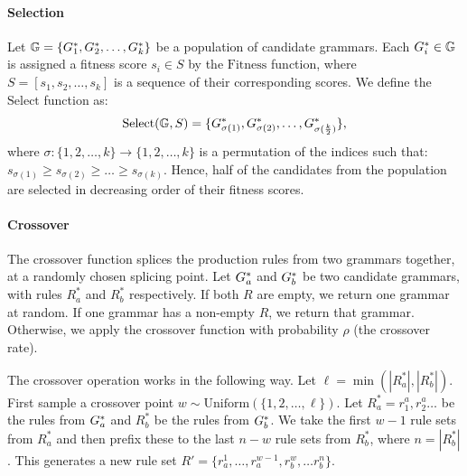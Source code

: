 \paragraph{Selection}
 Let $\mathbb{G} = \{G^*_1, G^*_2, \ldots, G^*_k\}$ be a population of candidate grammars.
% 
 Each $G^*_i \in \mathbb{G}$ is assigned a fitness score $s_i \in S$ by the $\mathrm{Fitness}$ function, where $S = [s_1,s_2,\dots,s_k]$ is a sequence of their corresponding scores. We define the $\mathrm{Select}$ function as:
 $$
\mathrm{Select}(\mathbb{G},S) = \{G^*_{\sigma(1)}, G^*_{\sigma(2)}, \dots, G^*_{\sigma(\frac{k}{2})}\},
$$
where $\sigma : \{1, 2, \dots, k\} \to \{1, 2, \dots, k\}$ is a permutation of the indices such that: $s_{\sigma(1)} \geq s_{\sigma(2)} \geq \dots \geq s_{\sigma(k)}$.
%
Hence, half of the candidates from the population are selected in decreasing order of their fitness scores.

\paragraph{Crossover}
The crossover function splices the production rules from two grammars together, at a randomly chosen splicing point. 
Let 
$G^*_a$ and $G^*_b$ be two candidate grammars, with rules $R^*_a$ and $R^*_b$ respectively.
%
If both $R$ are empty, we return one grammar at random. If one grammar has a non-empty $R$, we return that grammar. Otherwise, we apply the crossover function with probability $\rho$ (the crossover rate). 


The crossover operation works in the following way. Let $\ell = \min(|R^*_a|, |R^*_b|)$.
First sample a crossover point
$
w \sim \mathrm{Uniform}(\{1,2,\dots,\ell\}).
$
Let $R_a^* = r^a_1, r^a_2 \ldots $ be the rules from $G^*_a$ and $R_b^*$ be the rules from $G^*_b$. We take the first $w-1$ rule sets from $R_a^*$ and then prefix these to the last $n-w$ rule sets from $R_b^*$, where $n = |R^*_b|$. This generates a new rule set $R' = \{r^1_a, \ldots, r^{w-1}_a, r^w_b, \ldots r^n_b\}$. 

